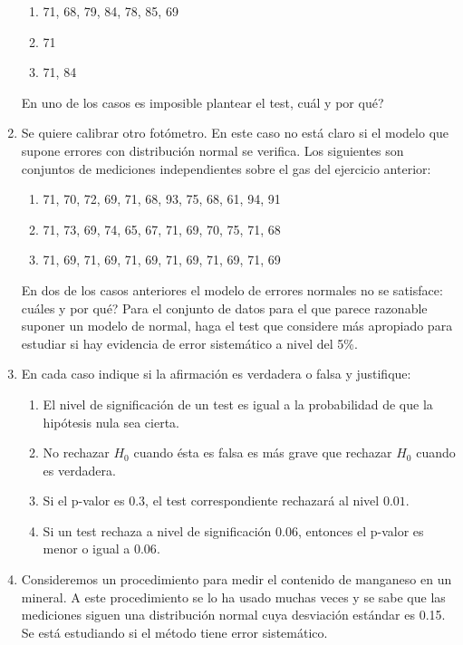 \documentclass[11pt,a4paper,twoside]{article}%
\begin{document}
\begin{enumerate}
\begin{enumerate}
\item 71, 68, 79, 84, 78, 85, 69

\item 71

\item 71, 84
\end{enumerate}

En uno de los casos es imposible plantear el test, \textquestiondown cu\'{a}l
y por qu\'{e}?

\item \label{ej3}Se quiere calibrar otro fot\'{o}metro. En este caso no
est\'{a} claro si el modelo que supone errores con distribuci\'{o}n normal se
verifica. Los siguientes son conjuntos de mediciones independientes sobre el
gas del ejercicio anterior:

\begin{enumerate}
\item 71, 70, 72, 69, 71, 68, 93, 75, 68, 61, 94, 91

\item 71, 73, 69, 74, 65, 67, 71, 69, 70, 75, 71, 68

\item 71, 69, 71, 69, 71, 69, 71, 69, 71, 69, 71, 69
\end{enumerate}

En dos de los casos anteriores el modelo de errores normales no se satisface:
\textquestiondown cu\'{a}les y por qu\'{e}? Para el conjunto de datos para el
que parece razonable suponer un modelo de normal, haga el test que considere
m\'{a}s apropiado para estudiar si hay evidencia de error sistem\'{a}tico a
nivel del 5\%.

\item En cada caso indique si la afirmaci\'on es verdadera o falsa y justifique:
\begin{enumerate}
\item El nivel de significaci\'on de un test es igual a la probabilidad de que la hip\'otesis nula sea cierta.
\item No rechazar $H_0$ cuando \'esta es falsa es m\'as grave que rechazar $H_0$ cuando es verdadera.
\item Si el p-valor es $0.3$, el test correspondiente rechazar\'a al nivel $0.01$.
\item Si un test rechaza a nivel de significaci\'on $0.06$, entonces el p-valor es menor o igual a $0.06$.
\end{enumerate}

\item Consideremos un procedimiento para medir el contenido de manganeso en un
mineral. A este procedimiento se lo ha usado muchas veces y se sabe que las
mediciones siguen una distribuci\'{o}n normal cuya desviaci\'{o}n est\'{a}ndar
es 0.15. Se est\'{a} estudiando si el m\'{e}todo tiene error sistem\'{a}tico.


\end{enumerate}
\end{document}
